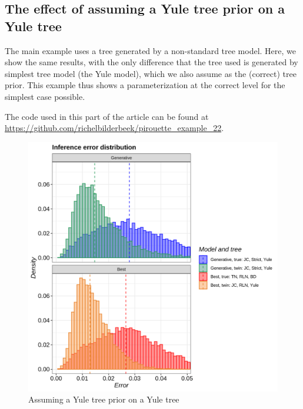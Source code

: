 \subsection{The effect of assuming a Yule tree prior on a Yule tree}
\label{subsec:simplest_correct_parameterization}


The main example uses a tree generated by a non-standard tree model.
Here, we show the same results, with the only difference that
the tree used is generated by simplest tree model (the Yule model),
which we also assume as the (correct) tree prior.
This example thus shows a parameterization at the correct level for the
simplest case possible.

The code used in this part of the article can be found at 
\url{https://github.com/richelbilderbeek/pirouette_example_22}.

\begin{figure}[H]
  \includegraphics[width=\textwidth]{pirouette_example_22/example_22/314/errors.png}
  \caption{Assuming a Yule tree prior on a Yule tree}
\end{figure}

